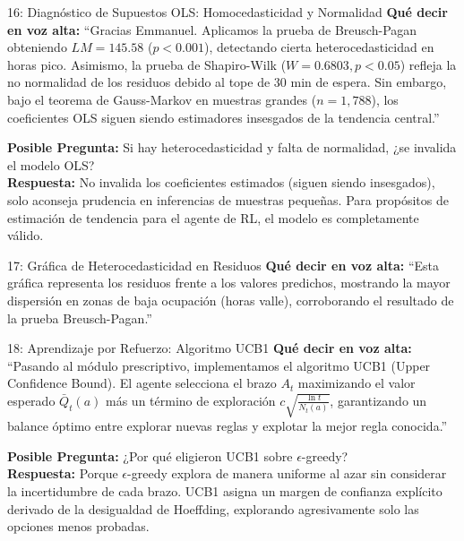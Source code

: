 \documentclass[11pt, a4paper]{article}
\begin{document}
\begin{ximenabox}{16: Diagnóstico de Supuestos OLS: Homocedasticidad y Normalidad}
\textbf{Qué decir en voz alta:}
``Gracias Emmanuel. Aplicamos la prueba de Breusch-Pagan obteniendo $LM = 145.58$ ($p < 0.001$), detectando cierta heterocedasticidad en horas pico. Asimismo, la prueba de Shapiro-Wilk ($W = 0.6803, p < 0.05$) refleja la no normalidad de los residuos debido al tope de 30 min de espera. Sin embargo, bajo el teorema de Gauss-Markov en muestras grandes ($n = 1,788$), los coeficientes OLS siguen siendo estimadores insesgados de la tendencia central.''

\begin{defensebox}
\textbf{Posible Pregunta:} Si hay heterocedasticidad y falta de normalidad, ¿se invalida el modelo OLS?\\
\textbf{Respuesta:} No invalida los coeficientes estimados (siguen siendo insesgados), solo aconseja prudencia en inferencias de muestras pequeñas. Para propósitos de estimación de tendencia para el agente de RL, el modelo es completamente válido.
\end{defensebox}
\end{ximenabox}

\begin{ximenabox}{17: Gráfica de Heterocedasticidad en Residuos}
\textbf{Qué decir en voz alta:}
``Esta gráfica representa los residuos frente a los valores predichos, mostrando la mayor dispersión en zonas de baja ocupación (horas valle), corroborando el resultado de la prueba Breusch-Pagan.''
\end{ximenabox}

\begin{ximenabox}{18: Aprendizaje por Refuerzo: Algoritmo UCB1}
\textbf{Qué decir en voz alta:}
``Pasando al módulo prescriptivo, implementamos el algoritmo UCB1 (Upper Confidence Bound). El agente selecciona el brazo $A_t$ maximizando el valor esperado $\bar{Q}_t(a)$ más un término de exploración $c \sqrt{\frac{\ln t}{N_t(a)}}$, garantizando un balance óptimo entre explorar nuevas reglas y explotar la mejor regla conocida.''

\begin{defensebox}
\textbf{Posible Pregunta:} ¿Por qué eligieron UCB1 sobre $\epsilon$-greedy?\\
\textbf{Respuesta:} Porque $\epsilon$-greedy explora de manera uniforme al azar sin considerar la incertidumbre de cada brazo. UCB1 asigna un margen de confianza explícito derivado de la desigualdad de Hoeffding, explorando agresivamente solo las opciones menos probadas.
\end{defensebox}
\end{ximenabox}
\end{document}
